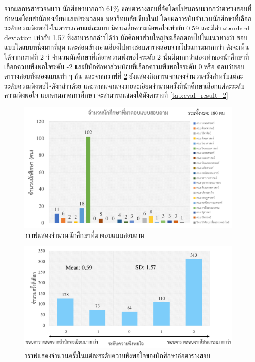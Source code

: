จากผลการสำรวจพบว่า นักศึกษามากกว่า 61\% ชอบตารางสอบที่จัดโดยโปรแกรมมากกว่าตารางสอบที่กำหนดโดยสำนักทะเบียนและประมวลผล มหาวิทยาลัยเชียงใหม่
โดยผลการนับจำนวนนักศึกษาที่เลือกระดับความพึงพอใจในตารางสอบแต่ละแบบ มีค่าเฉลี่ยความพึงพอใจเท่ากับ 0.59 และมีค่า standard deviation เท่ากับ 1.57 
ซึ่งสามารถกล่าวได้ว่า นักศึกษาส่วนใหญ่จะเลือกตอบไปในแนวทางว่า ชอบแบบใดแบบหนึ่งมากที่สุด และค่อนข้างเอนเอียงไปทางชอบตารางสอบจากโปรแกรมมากกว่า ดังจะเห็นได้จากกราฟที่ \ref{fig:eval_result_1}
ว่าจำนวนนักศึกษาที่เลือกความพึงพอใจระดับ 2 นั้นมีมากกว่าสองเท่าของนักศึกษาที่เลือกความพึงพอใจระดับ -2 และมีนักศึกษาส่วนน้อยที่เลือกความพึงพอใจระดับ 0 หรือ ตอบว่าชอบตารางสอบทั้งสองแบบเท่า ๆ กัน
และจากกราฟที่ \ref{fig:eval_result_1} ยังแสดงถึงการแจกแจงจำนวนครั้งสำหรับแต่ละระดับความพึงพอใจดังกล่าวด้วย และหากแจกแจงรายละเอียดจำนวนครั้งที่นักศึกษาเลือกแต่ละระดับความพึงพอใจ แยกตามภาคการศึกษา จะสามารถแสดงได้ดังตารางที่ \ref{tab:eval_result_2}
\begin{figure}
    \begin{center}
      \includegraphics[width=\linewidth]{images/eval_faculty_count.png}
    \end{center}
    \caption[กราฟแสดงจำนวนนักศึกษาที่มาตอบแบบสอบถาม]{กราฟแสดงจำนวนนักศึกษาที่มาตอบแบบสอบถาม}
    \label{fig:eval_faculty_count}     
\end{figure}
\begin{figure}
    \begin{center}
      \includegraphics[width=\linewidth]{images/eval_result_1.png}
    \end{center}
    \caption[กราฟแสดงจำนวนครั้งในแต่ละระดับความพึงพอใจของนักศึกษาต่อตารางสอบ]{กราฟแสดงจำนวนครั้งในแต่ละระดับความพึงพอใจของนักศึกษาต่อตารางสอบ}
    \label{fig:eval_result_1}     
\end{figure}
